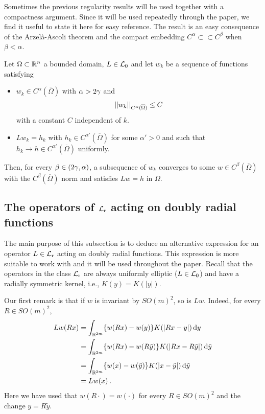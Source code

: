 Sometimes the previous regularity results will be used together with a compactness argument. Since
it will be used repeatedly through the paper, we find it useful to state it here for easy
reference. The result is an easy consequence of the Arzelà-Ascoli theorem and the compact embedding
$C^\alpha \subset \subset C^\beta$ when $\beta < \alpha$.

\begin{lemma}
\label{Lemma:CompactnessLemma} Let $\Omega\subset \mathbb{R}^n$ a bounded domain, $L\in \mathcal{L}_0$ and let
$w_k$ be a sequence of functions satisfying
\begin{itemize}
\item $w_k \in C^\alpha (\overline{\Omega})$ with $\alpha > 2\gamma$ and
$$
\left | \left |{w_k} \right | \right |_{C^\alpha (\overline{\Omega})} \leq C
$$
with a constant $C$ independent of $k$.
\item $L w_k = h_k$ with $h_k \in C^{\alpha'}(\overline{\Omega})$ for some $\alpha' > 0$ and such
    that $h_k \to h \in C^{\alpha'}(\overline{\Omega})$ uniformly.
\end{itemize}
Then, for every $\beta \in (2\gamma, \alpha)$, a subsequence of $w_k$ converges to some $w \in C^\beta
(\overline{\Omega})$ with the $C^\beta (\overline{\Omega})$ norm and satisfies $Lw = h$ in
$\Omega$.
\end{lemma}

\subsection{The operators of $\mathcal{L}_{\mathrm{r}}$ acting on doubly radial functions}

The main purpose of this subsection is to deduce an alternative expression for an operator $L\in \mathcal{L}_{\mathrm{r}}$ acting on doubly radial functions. This expression is more suitable to work with and it will be used throughout the paper. Recall that the operators in the class $\mathcal{L}_{\mathrm{r}}$ are always uniformly elliptic ($L\in \mathcal{L}_0$) and have a radially symmetric kernel, i.e., $K(y) = K(|y|)$.

Our first remark is that if $w$ is invariant by $SO(m)^2$, so is $Lw$. Indeed, for every $R \in
SO(m)^2$,
\begin{align*}
Lw (Rx)
& = \int_{\mathbb{R}^{2m}} \{w(Rx) - w(y)\} K(|Rx - y|)  \,\mathrm{d} y\\
& = \int_{\mathbb{R}^{2m}} \{w(Rx) - w(R\tilde{y})\} K(|Rx - R\tilde{y}|) \,\mathrm{d} \tilde{y}\\
& = \int_{\mathbb{R}^{2m}} \{w(x) - w(\tilde{y})\} K(|x-\tilde{y}|) \,\mathrm{d} \tilde{y}\\
& = Lw (x)\,.
\end{align*}
Here we have used that $w(R \cdot) = w(\cdot)$ for every $R\in SO(m)^2$ and the change $y =
R\tilde{y}$.


